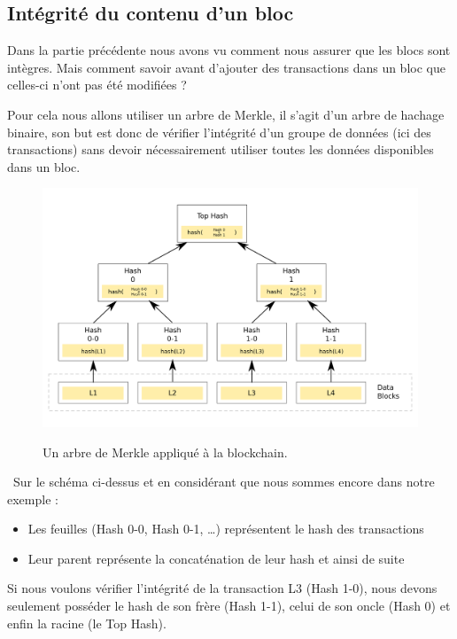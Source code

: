 \documentclass[12pt, a4paper, oneside]{book}
\begin{document}
    \subsection{Intégrité du contenu d’un bloc}

    Dans la partie précédente nous avons vu comment nous assurer que les blocs sont intègres. Mais comment savoir avant d’ajouter des transactions dans un bloc que celles-ci n’ont pas été modifiées ?
    
    Pour cela nous allons utiliser un arbre de Merkle, il s’agit d’un arbre de hachage binaire, son but est donc de vérifier l’intégrité d’un groupe de données (ici des transactions) sans devoir nécessairement utiliser toutes les données disponibles dans un bloc.

    \begin{figure}[H]
        \begin{center}
          \includegraphics[width=\textwidth]{images/arbre.png}
          \label{fig:arbre}
          \caption{Un arbre de Merkle appliqué à la blockchain.}
        \end{center}
    \end{figure}
    \newpage
    \noindent~Sur le schéma ci-dessus et en considérant que nous sommes encore dans notre exemple :

    \begin{itemize}
        \item Les feuilles (Hash 0-0, Hash 0-1, …) représentent le hash des transactions
        \item Leur parent représente la concaténation de leur hash et ainsi de suite
        \newline
    \end{itemize}
    Si nous voulons vérifier l’intégrité de la transaction L3 (Hash 1-0), nous devons seulement posséder le hash de son frère (Hash 1-1), celui de son oncle (Hash 0) et enfin la racine (le Top Hash).
    
\end{document}
